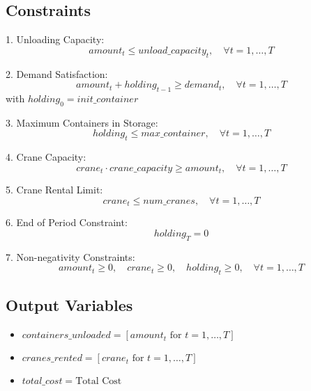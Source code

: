 \documentclass{article}
\begin{document}
\subsection*{Constraints}
1. Unloading Capacity:
\[
amount_{t} \leq unload\_capacity_{t}, \quad \forall t = 1, \ldots, T
\]

2. Demand Satisfaction:
\[
amount_{t} + holding_{t-1} \geq demand_{t}, \quad \forall t = 1, \ldots, T
\]
with $holding_{0} = init\_container$

3. Maximum Containers in Storage:
\[
holding_{t} \leq max\_container, \quad \forall t = 1, \ldots, T
\]

4. Crane Capacity:
\[
crane_{t} \cdot crane\_capacity \geq amount_{t}, \quad \forall t = 1, \ldots, T
\]

5. Crane Rental Limit:
\[
crane_{t} \leq num\_cranes, \quad \forall t = 1, \ldots, T
\]

6. End of Period Constraint:
\[
holding_{T} = 0
\]

7. Non-negativity Constraints:
\[
amount_{t} \geq 0, \quad crane_{t} \geq 0, \quad holding_{t} \geq 0, \quad \forall t = 1, \ldots, T
\]

\subsection*{Output Variables}
\begin{itemize}
    \item $containers\_unloaded = [amount_{t} \text{ for } t=1, \ldots, T]$
    \item $cranes\_rented = [crane_{t} \text{ for } t=1, \ldots, T]$
    \item $total\_cost = \text{Total Cost}$
\end{itemize}
\end{document}
